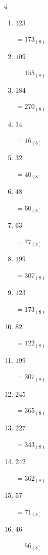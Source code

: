 \begin{multicols}{4}
\begin{enumerate}
        $=54_{(8)}$

  \item $123$

        $=173_{(8)}$

  \item $109$

        $=155_{(8)}$

  \item $184$

        $=270_{(8)}$

  \item $14$

        $=16_{(8)}$

  \item $32$

        $=40_{(8)}$

\columnbreak %

  \item $48$

        $=60_{(8)}$

  \item $63$

        $=77_{(8)}$

  \item $199$

        $=307_{(8)}$

  \item $123$

        $=173_{(8)}$

  \item $82$

        $=122_{(8)}$

  \item $199$

        $=307_{(8)}$

  \item $245$

        $=365_{(8)}$

  \item $227$

        $=343_{(8)}$

  \item $242$

        $=362_{(8)}$

  \item $57$

        $=71_{(8)}$

  \item $46$

        $=56_{(8)}$


\end{enumerate}
\end{multicols}
